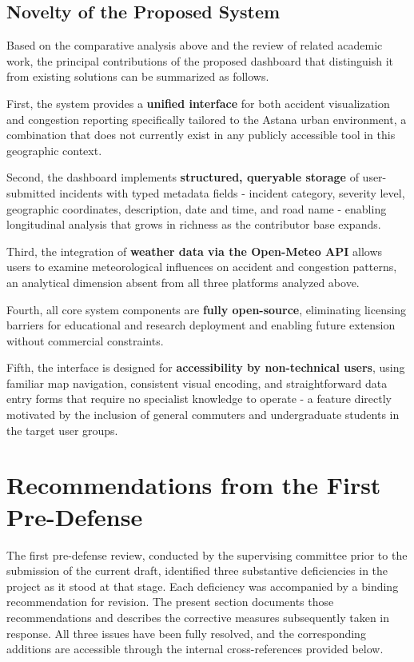 \documentclass[12pt,a4paper]{report}
\begin{document}
\subsection{Novelty of the Proposed System}

Based on the comparative analysis above and the review of related
academic work, the principal contributions of the proposed dashboard
that distinguish it from existing solutions can be summarized as
follows.

First, the system provides a \textbf{unified interface} for both
accident visualization and congestion reporting specifically tailored
to the Astana urban environment, a combination that does not currently
exist in any publicly accessible tool in this geographic context.

Second, the dashboard implements \textbf{structured, queryable storage}
of user-submitted incidents with typed metadata fields - incident
category, severity level, geographic coordinates, description, date and
time, and road name - enabling longitudinal analysis that grows in
richness as the contributor base expands.

Third, the integration of \textbf{weather data via the Open-Meteo API}
allows users to examine meteorological influences on accident and
congestion patterns, an analytical dimension absent from all three
platforms analyzed above.

Fourth, all core system components are \textbf{fully open-source},
eliminating licensing barriers for educational and research deployment
and enabling future extension without commercial constraints.

Fifth, the interface is designed for \textbf{accessibility by
non-technical users}, using familiar map navigation, consistent visual
encoding, and straightforward data entry forms that require no
specialist knowledge to operate - a feature directly motivated by the
inclusion of general commuters and undergraduate students in the target
user groups.

\section{Recommendations from the First Pre-Defense}

The first pre-defense review, conducted by the supervising committee prior
to the submission of the current draft, identified three substantive
deficiencies in the project as it stood at that stage. Each deficiency was
accompanied by a binding recommendation for revision. The present section
documents those recommendations and describes the corrective measures
subsequently taken in response. All three issues have been fully resolved,
and the corresponding additions are accessible through the internal
cross-references provided below.
\end{document}

